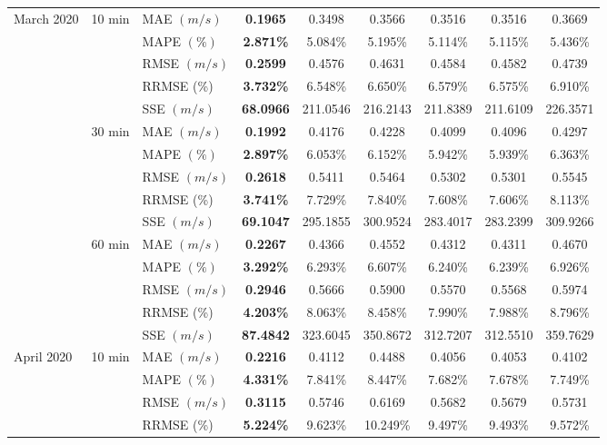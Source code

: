 {\begin{longtable}{lllcccccc}
March 2020 & 10 min & MAE {$(m/s)$} & \textbf{0.1965} & 0.3498 & 0.3566 & 0.3516 & 0.3516 & 0.3669 \\
&  & MAPE {$(\%)$} & \textbf{2.871\%} & 5.084\% & 5.195\% & 5.114\% & 5.115\% & 5.436\% \\
&  & RMSE {$(m/s)$} & \textbf{0.2599} & 0.4576 & 0.4631 & 0.4584 & 0.4582 & 0.4739 \\
& {} & {RRMSE {(\%)}} & {\textbf{3.732\%}} & {6.548\%} & {6.650\%} & {6.579\%} & {6.575\%} & {6.910\%} \\
& {} & {SSE {$(m/s)$}} & {\textbf{68.0966}} & {211.0546} & {216.2143} & {211.8389} & {211.6109} & {226.3571} \\
& 30 min & MAE {$(m/s)$} & \textbf{0.1992} & 0.4176 & 0.4228 & 0.4099 & 0.4096 & 0.4297 \\
&  & MAPE {$(\%)$} & \textbf{2.897\%} & 6.053\% & 6.152\% & 5.942\% & 5.939\% & 6.363\% \\
&  & RMSE {$(m/s)$} & \textbf{0.2618} & 0.5411 & 0.5464 & 0.5302 & 0.5301 & 0.5545 \\
& {} & {RRMSE {(\%)}} & {\textbf{3.741\%}} & {7.729\%} & {7.840\%} & {7.608\%} & {7.606\%} & {8.113\%} \\
& {} & {SSE {$(m/s)$}} & {\textbf{69.1047}} & {295.1855} & {300.9524} & {283.4017} & {283.2399} & {309.9266} \\
& 60 min & MAE {$(m/s)$} & \textbf{0.2267} & 0.4366 & 0.4552 & 0.4312 & 0.4311 & 0.4670 \\
&  & MAPE {$(\%)$} & \textbf{3.292\%} & 6.293\% & 6.607\% & 6.240\% & 6.239\% & 6.926\% \\
&  & RMSE {$(m/s)$} & \textbf{0.2946} & 0.5666 & 0.5900 & 0.5570 & 0.5568 & 0.5974 \\
& {} & {RRMSE {(\%)}} & {\textbf{4.203\%}} & {8.063\%} & {8.458\%} & {7.990\%} & {7.988\%} & {8.796\%} \\
& {} & {SSE {$(m/s)$}} & {\textbf{87.4842}} & {323.6045} & {350.8672} & {312.7207} & {312.5510} & {359.7629} \\\hline
April 2020 & 10 min & MAE {$(m/s)$} & \textbf{0.2216} & 0.4112 & 0.4488 & 0.4056 & 0.4053 & 0.4102 \\
&  & MAPE {$(\%)$} & \textbf{4.331\%} & 7.841\% & 8.447\% & 7.682\% & 7.678\% & 7.749\% \\
&  & RMSE {$(m/s)$} & \textbf{0.3115} & 0.5746 & 0.6169 & 0.5682 & 0.5679 & 0.5731 \\
& {} & {RRMSE {(\%)}} & {\textbf{5.224\%}} & {9.623\%} & {10.249\%} & {9.497\%} & {9.493\%} & {9.572\%} \\

\end{longtable}}
